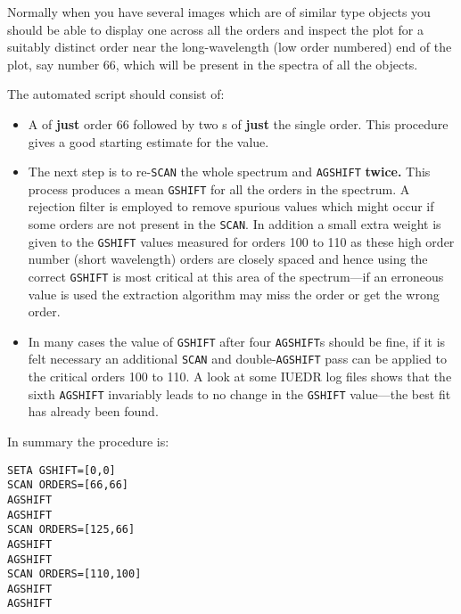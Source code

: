 Normally when you have several images which are of similar type objects you
should be able to display one 
 across all the orders and inspect
the plot for a suitably distinct order near the long-wavelength (low order
numbered) end of the plot, say number 66, which will be present in the
spectra of all the objects.

The automated script should consist of:

\begin{itemize}

\item A  of {\bf just} order 66 followed by
      two s of
      {\bf just} the single order.  This procedure gives a good starting
      estimate for the  value.

\item The next step is to re-\verb+SCAN+ the whole spectrum and \verb+AGSHIFT+
    {\bf twice.} This process produces a mean \verb+GSHIFT+ for all the orders
    in the spectrum.
    A rejection filter is employed to remove spurious values which might occur
    if some orders are not present in the \verb+SCAN+\@.  In addition a small
    extra
    weight is given to the \verb+GSHIFT+ values measured for orders 100 to 110
    as
    these high order number (short wavelength) orders are closely spaced and
    hence using the correct \verb+GSHIFT+ is most critical at this area of the
    spectrum---if an erroneous value is used the extraction algorithm may miss
    the order or get the wrong order.

\item In many cases the value of \verb+GSHIFT+ after four \verb+AGSHIFT+s
    should be fine, if
    it is felt necessary an additional \verb+SCAN+ and double-\verb+AGSHIFT+
    pass can be applied to the critical orders 100 to 110.  A look at some
    IUEDR log files
    shows that the sixth \verb+AGSHIFT+ invariably leads to no change in the
    \verb+GSHIFT+ value---the best fit has already been found.

\end{itemize}

In summary the procedure is:

\begin{verbatim}
SETA GSHIFT=[0,0]
SCAN ORDERS=[66,66]
AGSHIFT
AGSHIFT
SCAN ORDERS=[125,66]
AGSHIFT
AGSHIFT
SCAN ORDERS=[110,100]
AGSHIFT
AGSHIFT
\end{verbatim}

